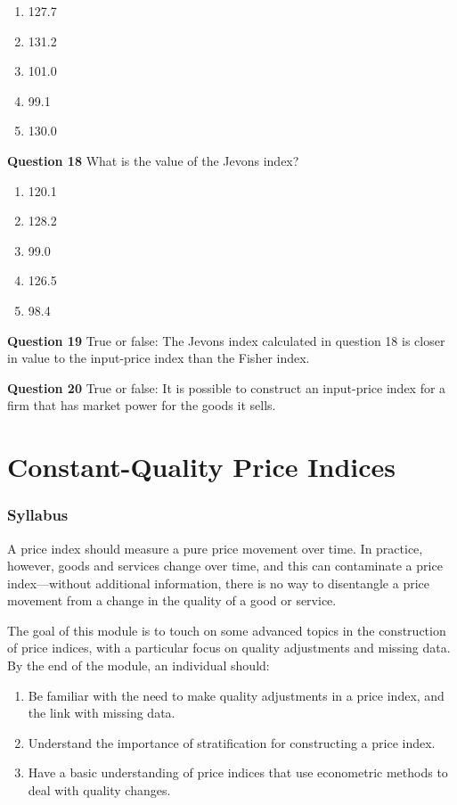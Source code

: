 \documentclass[]{article}
\begin{document}
\begin{enumerate}
\def\labelenumi{\alph{enumi})}
\item
  127.7
\item
  131.2
\item
  101.0
\item
  99.1
\item
  130.0
\end{enumerate}

\textbf{Question 18} What is the value of the Jevons index?

\begin{enumerate}
\def\labelenumi{\alph{enumi})}
\item
  120.1
\item
  128.2
\item
  99.0
\item
  126.5
\item
  98.4
\end{enumerate}

\textbf{Question 19} True or false: The Jevons index calculated in question 18 is closer in value to the input-price index than the Fisher index.

\textbf{Question 20} True or false: It is possible to construct an input-price index for a firm that has market power for the goods it sells.

\hypertarget{part-constant-quality-price-indices}{%
\part{Constant-Quality Price Indices}\label{part-constant-quality-price-indices}}

\hypertarget{syllabus-2}{%
\section{Syllabus}\label{syllabus-2}}

A price index should measure a pure price movement over time. In practice, however, goods and services change over time, and this can contaminate a price index---without additional information, there is no way to disentangle a price movement from a change in the quality of a good or service.

The goal of this module is to touch on some advanced topics in the construction of price indices, with a particular focus on quality adjustments and missing data. By the end of the module, an individual should:

\begin{enumerate}
\def\labelenumi{\arabic{enumi}.}
\item
  Be familiar with the need to make quality adjustments in a price index, and the link with missing data.
\item
  Understand the importance of stratification for constructing a price index.
\item
  Have a basic understanding of price indices that use econometric methods to deal with quality changes.
\end{enumerate}
\end{document}
